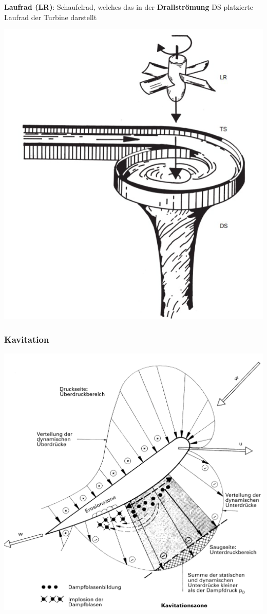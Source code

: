 \textbf{Laufrad (LR)}: Schaufelrad, welches das in der \textbf{Drallströmung} DS platzierte Laufrad der Turbine darstellt

\includegraphics[width=0.58\columnwidth, align=c]{images/Laufradturbinen.png}   



\subsubsection{Kavitation}

\includegraphics[width=0.98\columnwidth, align=c]{images/Kavitation.png}   

